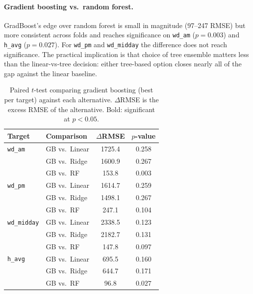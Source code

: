 \documentclass{article}
\begin{document}
\paragraph{Gradient boosting vs.\ random forest.}
GradBoost's edge over random forest is small in magnitude (97--247
RMSE) but more consistent across folds and reaches significance on
\texttt{wd\_am} ($p = 0.003$) and \texttt{h\_avg} ($p = 0.027$). For
\texttt{wd\_pm} and \texttt{wd\_midday} the difference does not reach
significance. The practical implication is that choice of tree
ensemble matters less than the linear-vs-tree decision: either
tree-based option closes nearly all of the gap against the linear
baseline.

\begin{table}[t]
  \centering
  \small
  \caption{Paired $t$-test comparing gradient boosting (best per target)
    against each alternative. $\Delta$RMSE is the excess RMSE of the
    alternative. Bold: significant at $p<0.05$.}
  \label{tab:sig}
  \begin{tabular}{@{}llcc@{}}
    \toprule
    Target              & Comparison     & $\Delta$RMSE & $p$-value        \\
    \midrule
    \texttt{wd\_am}     & GB vs.\ Linear & 1725.4       & 0.258            \\
                        & GB vs.\ Ridge  & 1600.9       & 0.267            \\
                        & GB vs.\ RF     & 153.8        & $\mathbf{0.003}$ \\
    \midrule
    \texttt{wd\_pm}     & GB vs.\ Linear & 1614.7       & 0.259            \\
                        & GB vs.\ Ridge  & 1498.1       & 0.267            \\
                        & GB vs.\ RF     & 247.1        & 0.104            \\
    \midrule
    \texttt{wd\_midday} & GB vs.\ Linear & 2338.5       & 0.123            \\
                        & GB vs.\ Ridge  & 2182.7       & 0.131            \\
                        & GB vs.\ RF     & 147.8        & 0.097            \\
    \midrule
    \texttt{h\_avg}     & GB vs.\ Linear & 695.5        & 0.160            \\
                        & GB vs.\ Ridge  & 644.7        & 0.171            \\
                        & GB vs.\ RF     & 96.8         & $\mathbf{0.027}$ \\
    \bottomrule
  \end{tabular}
\end{table}
\end{document}
